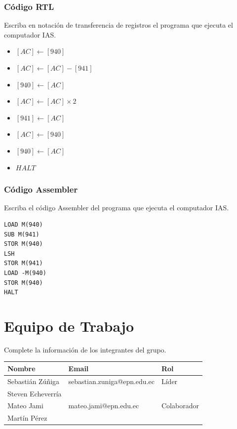 \documentclass{article}
\begin{document}
\subsubsection{Código RTL}
\label{sec:org0ef8b15}
\label{sec:orgc51d411}

Escriba en notación de transferencia de registros el programa que
ejecuta el computador IAS.

\begin{itemize}
\item \([AC] \leftarrow [940]\)
\item \([AC] \leftarrow [AC] - [941]\)
\item \([940] \leftarrow [AC]\)
\item \([AC] \leftarrow [AC] \times 2\)
\item \([941] \leftarrow [AC]\)
\item \([AC] \leftarrow [940]\)
\item \([940] \leftarrow [AC]\)
\item \(HALT\)
\end{itemize}


\subsubsection{Código Assembler}
\label{sec:orgd995192}
\label{sec:orgafa99c9}

Escriba el código Assembler del programa que ejecuta el computador
IAS.



\begin{verbatim}
LOAD M(940)
SUB M(941)
STOR M(940)
LSH
STOR M(941)
LOAD -M(940)
STOR M(940)
HALT

\end{verbatim}

\section{Equipo de Trabajo}
\label{sec:org5a4d27c}
\label{sec:orgefe8f18}

Complete la información de los integrantes del grupo.

\begin{center}
\begin{tabular}{lll}
\hline
Nombre & Email & Rol\\[0pt]
\hline
Sebastián Zúñiga & sebastian.zuniga@epn.edu.ec & Líder\\[0pt]
Steven Echeverría &  & \\[0pt]
Mateo Jami & mateo.jami@epn.edu.ec & Colaborador\\[0pt]
Martín Pérez &  & \\[0pt]
\hline
\end{tabular}
\end{center}
\end{document}
